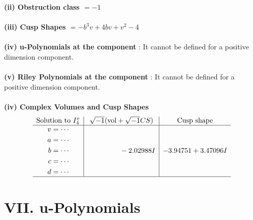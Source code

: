 \documentclass[1p]{elsarticle_modified}
\theoremstyle{definition}
\newcommand{\I}{\sqrt{-1}}
\begin{document}
\flushleft \textbf{(ii) Obstruction class $= -1$}\\~\\
\flushleft \textbf{(iii) Cusp Shapes $= - b^3 v+4 b v+v^2-4$}\\~\\
\flushleft \textbf{(iv) u-Polynomials at the component} : It cannot be defined for a positive dimension component.\\~\\
\flushleft \textbf{(v) Riley Polynomials at the component} : It cannot be defined for a positive dimension component.\\~\\
\newpage\flushleft \textbf{(iv) Complex Volumes and Cusp Shapes}
$$\begin{array}{c|c|c} 
\text{Solution to }I^v_{4}& \I (\text{vol} + \sqrt{-1}CS) & \text{Cusp shape}\\
 \hline 
\begin{aligned}
v &= \cdots \\
a &= \cdots \\
b &= \cdots \\
c &= \cdots \\
d &= \cdots\end{aligned}
 & \phantom{-0.000000 } -2.02988 I & -3.94751 + 3.47096 I\\
 \hline 
 \end{array}
$$
\newpage\renewcommand{\arraystretch}{1}
\centering \section*{ VII. u-Polynomials}
\end{document}
